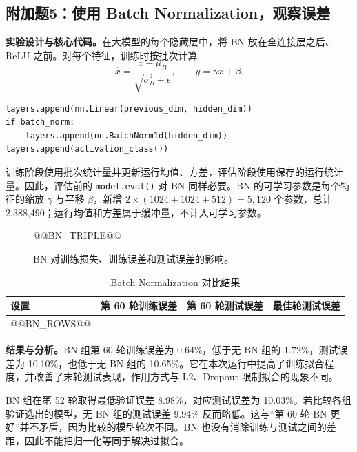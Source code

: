 \documentclass[UTF8,11pt,a4paper,fontset=fandol]{ctexart}
\newcommand{\question}[1]{\Needspace{14\baselineskip}\subsection{#1}}
\begin{document}
\question{附加题5：使用 Batch Normalization，观察误差}
\textbf{实验设计与核心代码。}在大模型的每个隐藏层中，将 BN 放在全连接层之后、ReLU 之前。对每个特征，训练时按批次计算
\begin{equation}
\hat{x}=\frac{x-\mu_B}{\sqrt{\sigma_B^2+\epsilon}},\qquad
y=\gamma\hat{x}+\beta.
\end{equation}
\par\noindent\begin{minipage}{\linewidth}
\begin{lstlisting}
layers.append(nn.Linear(previous_dim, hidden_dim))
if batch_norm:
    layers.append(nn.BatchNorm1d(hidden_dim))
layers.append(activation_class())
\end{lstlisting}
\end{minipage}\par
训练阶段使用批次统计量并更新运行均值、方差，评估阶段使用保存的运行统计量。因此，评估前的 \texttt{model.eval()} 对 BN 同样必要。BN 的可学习参数是每个特征的缩放 $\gamma$ 与平移 $\beta$，新增 $2\times(1024+1024+512)=5,120$ 个参数，总计 2,388,490；运行均值和方差属于缓冲量，不计入可学习参数。
\begin{figure}[H]\centering
@@BN_TRIPLE@@
\caption{BN 对训练损失、训练误差和测试误差的影响。}\label{fig:bn}
\end{figure}
\begin{table}[H]\centering\small
\caption{Batch Normalization 对比结果}
\begin{tabular}{lrrr}\toprule
设置 & 第 60 轮训练误差 & 第 60 轮测试误差 & 最佳轮测试误差 \\\midrule
@@BN_ROWS@@
\bottomrule\end{tabular}
\end{table}
\textbf{结果与分析。}BN 组第 60 轮训练误差为 0.64\%，低于无 BN 组的 1.72\%，测试误差为 10.10\%，也低于无 BN 组的 10.65\%。它在本次运行中提高了训练拟合程度，并改善了末轮测试表现，作用方式与 L2、Dropout 限制拟合的现象不同。

BN 组在第 52 轮取得最低验证误差 8.98\%，对应测试误差为 10.03\%。若比较各组验证选出的模型，无 BN 组的测试误差 9.94\% 反而略低。这与“第 60 轮 BN 更好”并不矛盾，因为比较的模型轮次不同。BN 也没有消除训练与测试之间的差距，因此不能把归一化等同于解决过拟合。
\end{document}
